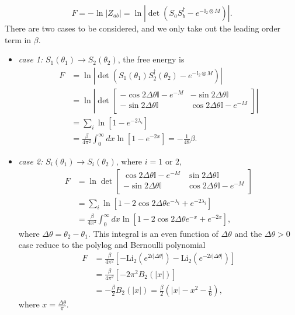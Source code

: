\begin{equation}
F = - \ln |Z_{ab}| = \ln |\det ( S_a S_b^{\dagger} - e^{- \mathbb{I}_2 \otimes M} )| .
\end{equation}
There are two cases to be considered, and we only take out the leading order term in $\beta$. 
\begin{itemize}
\item {\it case 1: }$S_1( \theta_1 ) \rightarrow S_2 ( \theta_2 ) $, the free energy is
\begin{equation}
\begin{aligned}
F & = \ln |\det ( S_1( \theta_1 )  S_2^{\dagger}( \theta_2 )  - e^{- \mathbb{I}_2 \otimes M} )| \\
  & = \ln \left| \det
\begin{bmatrix}
-\cos 2 \Delta \theta \mathbb{I} - e^{-M}   & -\sin 2 \Delta \theta \mathbb{I}\\
- \sin 2\Delta \theta \mathbb{I}  &   \cos 2 \Delta \theta \mathbb{I} - e^{-M} \\ 
\end{bmatrix} \right| \\
& = \sum_i \ln [ 1 -  e^{- 2 \lambda_i }  ] \\
& = \frac{\beta}{4\pi^2} \int_0^{\infty} dx \ln [ 1 - e^{-2x} ]  = - \frac{1}{48 }\beta .
\end{aligned}
\end{equation}
\item {\it case 2:} $S_i( \theta_1 ) \rightarrow S_i( \theta_2 )$, where $i = 1 $ or $ 2$, 
\begin{equation}
\begin{aligned}
F & = \ln \det 
\begin{bmatrix}
\cos 2 \Delta \theta \mathbb{I} - e^{-M}   & \sin 2 \Delta \theta \mathbb{I}\\
- \sin 2\Delta \theta \mathbb{I}  &   \cos 2 \Delta \theta \mathbb{I} - e^{-M} \\ 
\end{bmatrix} \\
& = \sum_i \ln [ 1 - 2 \cos 2 \Delta \theta e^{- \lambda_i } + e^{- 2 \lambda_i }  ] \\
& = \frac{\beta}{4\pi^2} \int_0^{\infty} dx \ln [ 1 - 2 \cos 2 \Delta \theta e^{-x} + e^{-2x} ] ,
\end{aligned}
\end{equation}
where $\Delta \theta = \theta_2 - \theta_1$. This integral is an even function of $\Delta \theta$ and the $\Delta \theta > 0$ case reduce to the polylog and Bernoulli polynomial
\begin{equation}
\begin{aligned}
  F &= \frac{\beta}{4\pi^2} \left[ - \text{Li}_2 ( e^{2i |\Delta \theta|} ) - \text{Li}_2 ( e^{- 2i |\Delta \theta|} ) \right] \\
  & = \frac{\beta}{4\pi^2}  \left[ - 2\pi^2 B_2 (|x|) \right] \\
  &= - \frac{\beta}{2} B_2( |x| )  = \frac{\beta}{2} (| x| - x^2 - \frac{1}{6} ),
\end{aligned}
\end{equation}
where $x = \frac{\Delta \theta}{ \pi}$. 
\end{itemize}




